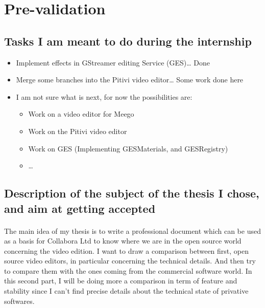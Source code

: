\newpage
\section{Pre-validation}

\subsection{Tasks I am meant to do during the internship}

    \begin {itemize}
        \item {Implement effects in GStreamer editing Service (GES)\ldots
               Done}
        \item {Merge some branches into the Pitivi video editor\ldots
               Some work done here}
        \item {I am not sure what is next, for now the possibilities are:}
        \begin {itemize}
            \item {Work on a video editor for Meego}
            \item {Work on the Pitivi video editor}
            \item {Work on GES (Implementing GESMaterials, and GESRegistry)}
            \item {\ldots}
        \end {itemize}
    \end {itemize}

\subsection{Description of the subject of the thesis I chose, and aim at
  getting accepted}

  \paragraph{}
      The main idea of my thesis is to write a professional document which can
      be used as a basis for Collabora Ltd to know where we are in the open
      source world concerning the video edition. I want to draw a comparison
      between first, open source video editors, in particular concerning the
      technical details. And then try to compare them with the ones coming
      from the commercial software world. In this second part, I will be
      doing more a comparison in term of feature and stability since I can't
      find precise details about the technical state of privative softwares.

